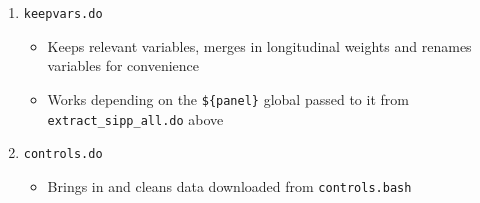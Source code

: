 \documentclass{article}
\begin{document}
\begin{enumerate}
\begin{itemize}
	\end{itemize}
\item {\tt keepvars.do}
	\begin{itemize}
	\item Keeps relevant variables, merges in longitudinal weights and renames variables for convenience
	\item Works depending on the {\tt \$\{panel\}} global passed to it from {\tt extract\_sipp\_all.do} above
	\end{itemize}
\item {\tt controls.do}
	\begin{itemize}
	\item Brings in and cleans data downloaded from {\tt controls.bash}
	\end{itemize}
\end{enumerate}
\end{document}
